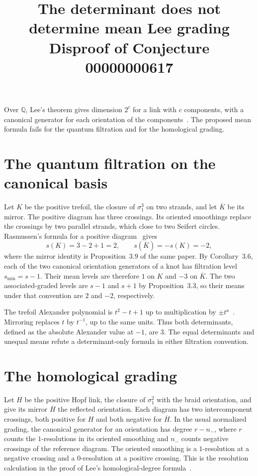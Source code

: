 \documentclass[11pt]{article}
\title{The determinant does not determine mean Lee grading\\[2pt]
  \large Disproof of Conjecture 00000000617}
\author{}
\date{}
\begin{document}
\maketitle

Over $\mathbb Q$, Lee's theorem gives dimension $2^c$ for a link with
$c$ components, with a canonical generator for each orientation
of the components~\cite[Theorem~4.2 and \S4.4.3]{lee}. The proposed mean
formula fails for the quantum filtration and for the homological grading.

\section*{The quantum filtration on the canonical basis}

Let $K$ be the positive trefoil, the closure of $\sigma_1^3$ on two
strands, and let $\overline K$ be its mirror. The positive diagram has
three crossings. Its oriented smoothings replace the crossings by two
parallel strands, which close to two Seifert circles. Rasmussen's formula
for a positive diagram~\cite[\S5.2]{rasmussen} gives
\[
  s(K)=3-2+1=2,
  \qquad s(\overline K)=-s(K)=-2,
\]
where the mirror identity is Proposition~3.9 of the same paper. By
Corollary~3.6, each of the two canonical orientation generators of a knot
has filtration level $s_{\min}=s-1$. Their mean levels are therefore $1$
on $K$ and $-3$ on $\overline K$. The two associated-graded levels are
$s-1$ and $s+1$ by Proposition~3.3, so their means under that convention
are $2$ and $-2$, respectively.

The trefoil Alexander polynomial is $t^2-t+1$ up to multiplication by
$\pm t^a$~\cite[Example~B.1]{nicolaescu}. Mirroring replaces $t$ by
$t^{-1}$, up to the same units. Thus both determinants, defined as the
absolute Alexander value at $-1$, are $3$. The equal determinants and
unequal means refute a determinant-only formula in either filtration
convention.

\section*{The homological grading}

Let $H$ be the positive Hopf link, the closure of $\sigma_1^2$ with the
braid orientation, and give its mirror $\overline H$ the reflected
orientation. Each diagram has two intercomponent crossings, both positive
for $H$ and both negative for $\overline H$. In the usual normalized
grading, the canonical generator for an orientation has degree $r-n_-$,
where $r$ counts the $1$-resolutions in its oriented smoothing and $n_-$
counts negative crossings of the reference diagram. The oriented
smoothing is a $1$-resolution at a negative crossing and a $0$-resolution
at a positive crossing. This is the resolution calculation in the proof
of Lee's homological-degree formula~\cite[Proposition~4.3]{lee}.
\end{document}
